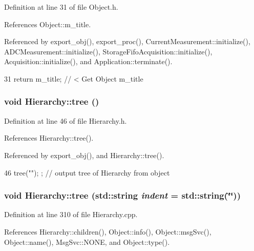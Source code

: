 Definition at line 31 of file Object.h.

References Object::m\_\-title.

Referenced by export\_\-obj(), export\_\-proc(), CurrentMeasurement::initialize(), ADCMeasurement::initialize(), StorageFifoAcquisition::initialize(), Acquisition::initialize(), and Application::terminate().


\begin{DoxyCode}
31 { return m_title;      } // < Get Object m_title
\end{DoxyCode}
\hypertarget{classHierarchy_a594c294c5f60c230e106d522ed008212}{
\subsubsection[{tree}]{\setlength{\rightskip}{0pt plus 5cm}void Hierarchy::tree ()}}
\label{classHierarchy_a594c294c5f60c230e106d522ed008212}


Definition at line 46 of file Hierarchy.h.

References Hierarchy::tree().

Referenced by export\_\-obj(), and Hierarchy::tree().


\begin{DoxyCode}
46 { tree(""); };                     // output tree of Hierarchy from object
\end{DoxyCode}
\hypertarget{classHierarchy_a76e914b9a677a22a82deb74d892bf261}{
\subsubsection[{tree}]{\setlength{\rightskip}{0pt plus 5cm}void Hierarchy::tree (std::string {\em indent} = {\ttfamily std::string(\char`\"{}\char`\"{})})}}
\label{classHierarchy_a76e914b9a677a22a82deb74d892bf261}


Definition at line 310 of file Hierarchy.cpp.

References Hierarchy::children(), Object::info(), Object::msgSvc(), Object::name(), MsgSvc::NONE, and Object::type().


